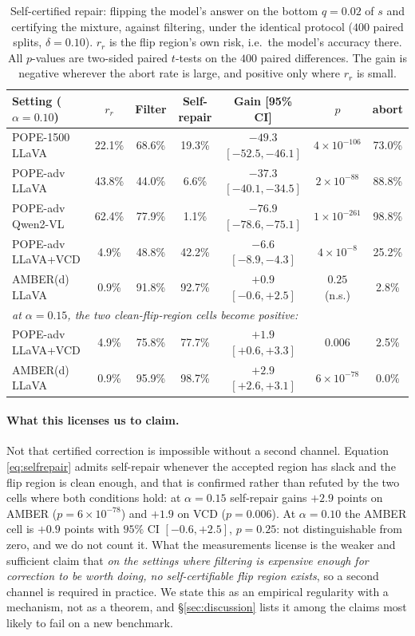 \documentclass{article}
\theoremstyle{plain}
\theoremstyle{definition}
\theoremstyle{remark}
\begin{document}
\begin{table}[t]
\centering
\caption{Self-certified repair: flipping the model's answer on the bottom $q=0.02$ of $s$ and
certifying the mixture, against filtering, under the identical protocol ($400$ paired splits,
$\delta=0.10$). $r_r$ is the flip region's own risk, i.e.\ the model's accuracy there. All
$p$-values are two-sided paired $t$-tests on the $400$ paired differences. The gain is
negative wherever the abort rate is large, and positive only where $r_r$ is small.}
\label{tab:selfrepair}
\small
\begin{tabular}{lcccccc}
\toprule
Setting ($\alpha=0.10$) & $r_r$ & Filter & Self-repair & Gain [95\% CI] & $p$ & abort\\
\midrule
POPE-1500 LLaVA    & 22.1\% & 68.6\% & 19.3\% & $-49.3$ $[-52.5,-46.1]$ & $4\!\times\!10^{-106}$ & 73.0\%\\
POPE-adv LLaVA     & 43.8\% & 44.0\% & \phantom{0}6.6\% & $-37.3$ $[-40.1,-34.5]$ & $2\!\times\!10^{-88}$ & 88.8\%\\
POPE-adv Qwen2-VL  & 62.4\% & 77.9\% & \phantom{0}1.1\% & $-76.9$ $[-78.6,-75.1]$ & $1\!\times\!10^{-261}$ & 98.8\%\\
POPE-adv LLaVA+VCD & \phantom{0}4.9\% & 48.8\% & 42.2\% & $-6.6$ $[-8.9,-4.3]$ & $4\!\times\!10^{-8}$ & 25.2\%\\
AMBER(d) LLaVA     & \phantom{0}0.9\% & 91.8\% & 92.7\% & $+0.9$ $[-0.6,+2.5]$ & $0.25$ (n.s.) & \phantom{0}2.8\%\\
\midrule
\multicolumn{7}{l}{\emph{at $\alpha=0.15$, the two clean-flip-region cells become positive:}}\\
POPE-adv LLaVA+VCD & \phantom{0}4.9\% & 75.8\% & 77.7\% & $+1.9$ $[+0.6,+3.3]$ & $0.006$ & \phantom{0}2.5\%\\
AMBER(d) LLaVA     & \phantom{0}0.9\% & 95.9\% & 98.7\% & $+2.9$ $[+2.6,+3.1]$ & $6\!\times\!10^{-78}$ & \phantom{0}0.0\%\\
\bottomrule
\end{tabular}
\end{table}

\paragraph{What this licenses us to claim.}
Not that certified correction is impossible without a second channel. Equation
\eqref{eq:selfrepair} admits self-repair whenever the accepted region has slack and the flip
region is clean enough, and that is confirmed rather than refuted by the two cells where both
conditions hold: at $\alpha=0.15$ self-repair gains $+2.9$ points on AMBER
($p=6\times10^{-78}$) and $+1.9$ on VCD ($p=0.006$). At $\alpha=0.10$ the AMBER cell is
$+0.9$ points with $95\%$ CI $[-0.6,+2.5]$, $p=0.25$: not distinguishable from zero, and we do
not count it. What the measurements license is the weaker and sufficient claim that \emph{on the
settings where filtering is expensive enough for correction to be worth doing, no
self-certifiable flip region exists}, so a second channel is required in practice. We state this
as an empirical regularity with a mechanism, not as a theorem, and \S\ref{sec:discussion} lists
it among the claims most likely to fail on a new benchmark.
\end{document}
